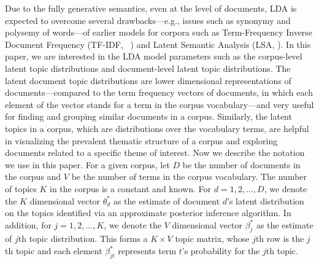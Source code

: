 Due to the fully generative semantics, even at the level of 
documents, LDA is expected to overcome several drawbacks---e.g., 
issues such as synonymy and polysemy of words---of earlier models 
for corpora such as Term-Frequency Inverse Document Frequency 
(TF-IDF, \citeauthor{Salton1975}~\citeyear{Salton1975}) and Latent 
Semantic Analysis (LSA, \citeauthor{Dumais1995} 
\citeyear{Dumais1995}). In this paper, we are interested in the LDA 
model parameters such as the corpus-level latent topic distributions 
and document-level latent topic distributions. The latent document 
topic distributions are lower dimensional representations of 
documents---compared to the term frequency vectors of documents, in 
which each element of the vector stands for a term in the corpus 
vocabulary---and very useful for finding and grouping similar 
documents in a corpus. Similarly, the latent topics in a corpus, 
which are distributions over the vocabulary terms, are helpful in 
visualizing the prevalent thematic structure of a corpus and 
exploring documents related to a specific theme of interest. Now 
we describe the notation we use in this paper. For a given corpus, 
let $D$ be the number of documents in the corpus and $V$ be the 
number of terms in the corpus vocabulary. The number of topics $K$ 
in the corpus is a constant and known. For $d = 1, 2, \ldots, D$, we 
denote the $K$ dimensional vector $\theta_d^{*}$ as the estimate of 
document $d$'s latent distribution on the topics identified via an 
approximate posterior inference algorithm. In addition, for $j = 1, 
2, \ldots, K$, we denote the $V$ dimensional vector $\beta_j^{*}$ as 
the estimate of $j$th topic distribution. This forms a $K \times V$ 
topic matrix, whose $j$th row is the $j$th topic and each element 
$\beta_{jt}^{*}$ represents term $t$'s probability for the 
$j$th topic.   





